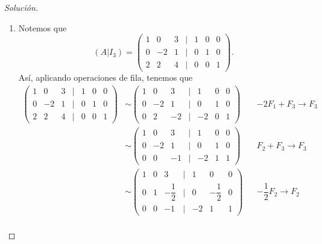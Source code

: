 \documentclass[a4,11pt]{aleph-notas}
\begin{document}
\begin{proof}[Solución]
\begin{enumerate}
\[\begin{pmatrix}
                0 & 1 & | & -1 & \dfrac{2}{3}
            \end{pmatrix},
        \]
        y, por lo tanto 
        \[
            A^{-1} = \begin{pmatrix}
                0 & \dfrac{1}{3} \\[0.75em]
                -1 & \dfrac{2}{3}
            \end{pmatrix}.
        \]
    \item Notemos que 
        \[
           (A|I_3) =  \begin{pmatrix}
                1 & 0 & 3 & | & 1 & 0 & 0 \\
                0 & -2 & 1 & | & 0 & 1 & 0 \\
                2 & 2 & 4 & | & 0 & 0 & 1 
            \end{pmatrix}.
        \]
        Así, aplicando operaciones de fila, tenemos que 
        \begin{align*}
            \begin{pmatrix}
                1 & 0 & 3 & | & 1 & 0 & 0 \\
                0 & -2 & 1 & | & 0 & 1 & 0 \\
                2 & 2 & 4 & | & 0 & 0 & 1 
            \end{pmatrix} & \sim \begin{pmatrix}
                1 & 0 & 3 & | & 1 & 0 & 0 \\
                0 & -2 & 1 & | & 0 & 1 & 0 \\
                0 & 2 & -2 & | & -2 & 0 & 1 
            \end{pmatrix} && - 2 F_1 + F_3 \rightarrow F_3 \\
            & \sim \begin{pmatrix}
                1 & 0 & 3 & | & 1 & 0 & 0 \\
                0 & -2 & 1 & | & 0 & 1 & 0 \\
                0 & 0 & -1 & | & -2 & 1 & 1 
            \end{pmatrix} && F_2 + F_3 \rightarrow F_3 \\
            & \sim \begin{pmatrix}
                1 & 0 & 3 & | & 1 & 0 & 0 \\
                0 & 1 & -\dfrac{1}{2} & | & 0 & -\dfrac{1}{2} & 0 \\
                0 & 0 & -1 & | & -2 & 1 & 1 
            \end{pmatrix} && -\dfrac{1}{2} F_2 \rightarrow F_2 \\

\end{align*}
\end{enumerate}
\end{proof}
\end{document}

